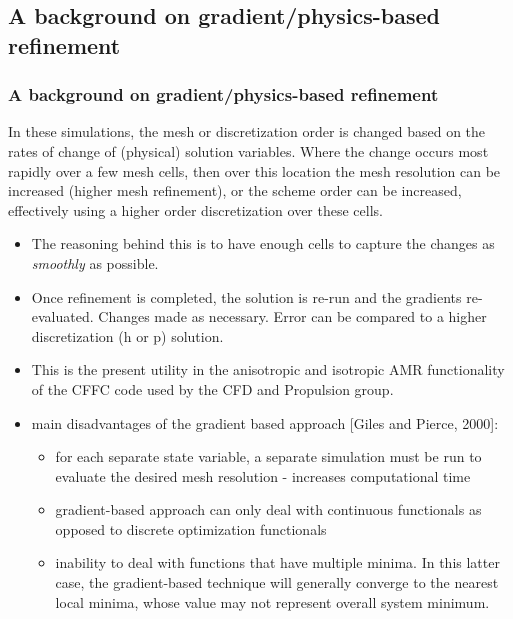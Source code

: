 \documentclass{beamer}
\begin{document}
\subsection[Gradient]{A background on gradient/physics-based refinement}
\begin{frame}%
\scriptsize
\frametitle{A background on gradient/physics-based refinement}
In these simulations, the mesh or discretization order is changed based on the rates of change of (physical) solution variables.\newline
Where the change occurs most rapidly over a few mesh cells, then over this location the mesh resolution can be increased (higher mesh refinement), or the scheme order can be increased, effectively using a higher order discretization over these cells.

\begin{itemize}
\item The reasoning behind this is to have enough cells to capture the changes as \textit{smoothly} as possible.
\item Once refinement is completed, the solution is re-run and the gradients re-evaluated. Changes made as necessary. Error can be compared to a higher discretization (h or p) solution.
\item This is the present utility in the anisotropic and isotropic AMR functionality of the CFFC code used by the CFD and Propulsion group.
\item main disadvantages of the gradient based approach [Giles and Pierce, 2000]:
\begin{itemize}
\tiny
\item for each separate state variable, a separate simulation must be run to evaluate the desired mesh resolution - increases computational time
\item gradient-based approach can only deal with continuous functionals as opposed to discrete optimization functionals
\item inability to deal with functions that have multiple minima. In this latter case, the gradient-based technique will generally converge to the nearest local minima, whose value may not represent overall system minimum.
\end{itemize}
\end{itemize}
\end{frame}
\end{document}
